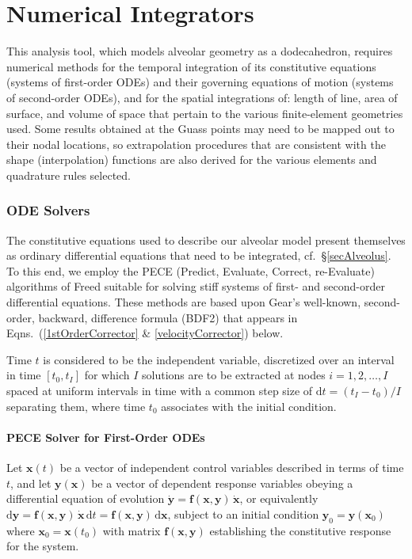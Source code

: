 \part{Numerical Integrators}
\label{partNumericalMethods}

This analysis tool, which models alveolar geometry as a dodecahedron, requires numerical methods for the temporal integration of its constitutive equations (systems of first-order ODEs) and their governing equations of motion (systems of second-order ODEs), and for the spatial integrations of: length of line, area of surface, and volume of space that pertain to the various finite-element geometries used.  Some results obtained at the Guass points may need to be mapped out to their nodal locations, so extrapolation procedures that are consistent with the shape (interpolation) functions are also derived for the various elements and quadrature rules selected.

\section{ODE Solvers}

The constitutive equations used to describe our alveolar model present themselves as ordinary differential equations that need to be integrated, cf.\ \S\ref{secAlveolus}.  To this end, we employ the PECE (Predict, Evaluate, Correct, re-Evaluate) algorithms of Freed \cite{Freed17a} suitable for solving stiff systems of first- and second-order differential equations.  These methods are based upon Gear's well-known, second-order, backward, difference formula (BDF2) that appears in Eqns.~(\ref{1stOrderCorrector} \& \ref{velocityCorrector}) below.

Time $t$ is considered to be the independent variable, discretized over an interval in time $[t_0, t_I]$ for which $I$ solutions are to be extracted at nodes $i=1, 2, \ldots, I$ spaced at uniform intervals in time with a common step size of $\mathrm{d}t = (t_I - t_0)/I$ separating them, where time $t_0$ associates with the initial condition.

\subsection{PECE Solver for First-Order ODEs}
\label{sec:1stOrderPECE}

Let $\mathbf{x}(t)$ be a vector of independent control variables described in terms of time $t$, and let $\mathbf{y} (\mathbf{x})$ be a vector of dependent response variables obeying a differential equation of evolution $\dot{\mathbf{y}} = \mathbf{f} (\mathbf{x}, \mathbf{y}) \, \dot{\mathbf{x}}$, or equivalently $\mathrm{d} \mathbf{y} = \mathbf{f} (\mathbf{x}, \mathbf{y}) \, \dot{\mathbf{x}} \, \mathrm{d} t = \mathbf{f} (\mathbf{x}, \mathbf{y}) \, \mathrm{d}\mathbf{x}$, subject to an initial condition $\mathbf{y}_0 = \mathbf{y}(\mathbf{x}_0)$ where $\mathbf{x}_0 = \mathbf{x} (t_0)$ with matrix $\mathbf{f} (\mathbf{x}, \mathbf{y})$ establishing the constitutive response for the system.

